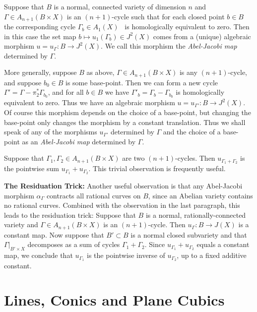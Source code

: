 \documentclass[amssymb,twoside,12 pt,amscd,reqno]{amsart}
\theoremstyle{plain}
\theoremstyle{definition}
\def\ps{\vspace{4pt}}
\begin{document}
\ps

Suppose that $B$ is a normal, connected variety of dimension $n$ and
$\Gamma\in A_{n+1}(B\times X)$ is an $(n+1)$-cycle such that for each
closed point $b\in B$ the corresponding cycle $\Gamma_b\in
A_1(X)$~\cite[\S 10.1]{F} is homologically equivalent to zero.  Then
in this case the set map $b\mapsto u_1(\Gamma_b)\in J^2(X)$ comes from 
a (unique) algebraic morphism $u=u_\Gamma:B\rightarrow J^2(X)$.  We
call this morphism the \emph{Abel-Jacobi map} determined by $\Gamma$.

\ps

More generally, suppose $B$ as above, $\Gamma\in A_{n+1}(B\times
X)$ is any $(n+1)$-cycle, and suppose $b_0\in B$ is some base-point.
Then we can form a new cycle $\Gamma'=\Gamma - \pi_2^*\Gamma_{b_0}$,
and for all $b\in B$ we have $\Gamma'_b = \Gamma_b - \Gamma_{b_0}$ is
homologically equivalent to zero.  Thus we have an algebraic morphism
$u=u_{\Gamma'}:B\rightarrow J^2(X)$.  Of course this morphism depends
on the choice of a base-point, but changing the base-point only
changes the morphism by a constant translation.  Thus we shall speak
of any of the morphisms $u_{\Gamma'}$ determined by $\Gamma$ and the
choice of a base-point as an \emph{Abel-Jacobi map} determined by
$\Gamma$.  

\ps

Suppose that $\Gamma_1,\Gamma_2\in A_{n+1}(B\times X)$ are two
$(n+1)$-cycles.  Then $u_{\Gamma_1+\Gamma_2}$ is the pointwise sum
$u_{\Gamma_1}+u_{\Gamma_2}$.  This trivial observation is frequently
useful.  

\ps 

\textbf{The Residuation Trick:}
Another useful observation is that any Abel-Jacobi morphism
$\alpha_\Gamma$ contracts all rational curves on $B$, since an Abelian 
variety contains no rational curves.  Combined with the observation in
the last paragraph, this leads to the residuation trick:  Suppose that
$B$ is a normal, rationally-connected variety and $\Gamma\in A_{n+1}(B\times 
X)$ is an $(n+1)$-cycle.  Then $u_\Gamma:B\rightarrow J(X)$ is a
constant map.  Now suppose that $B'\subset B$ is a normal closed
subvariety and that $\Gamma|_{B'\times X}$ decomposes as a sum of
cycles $\Gamma_1+\Gamma_2$.  Since $u_{\Gamma_1}+u_{\Gamma_2}$ equals
a constant map, we conclude that $u_{\Gamma_1}$ is the pointwise
inverse of $u_{\Gamma_2}$, up to a fixed additive constant.  


\section{Lines, Conics and Plane Cubics}~\label{sec-123}
\end{document}
